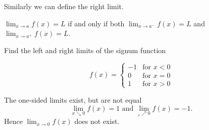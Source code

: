 \documentclass[../main.tex]{subfiles}
\begin{document}
  Similarly we can define the right limit.

  \begin{theorem}
    $\lim_{x \to a} f(x) = L$ if and only if both $\lim_{x \to a^{-}} f(x) =L$ and $\lim_{x \to a^{+}} f(x) = L$.
  \end{theorem}

  \begin{example}
    Find the left and right limits of the signum function

    \begin{minipage}[c]{0.5\textwidth}
      \[
        f(x) =
        \begin{cases}
          -1 & \text{for $x<0$}\\ 0 & \text{for $x=0$}\\ 1 & \text{for $x>0$}
        \end{cases}
      \]
    \end{minipage}
    \begin{minipage}[c]{0.2\textwidth}
      \begin{figure}[H]
        \centering
        
      \end{figure}
    \end{minipage}
  \end{example}
  \begin{solution}
    The one-sided limits exist, but are not equal
    \[
      \lim_{x\searrow0}f(x) = 1 \text{ and } \lim_{_x\nearrow0}f(x) = -1.
    \]
    Hence $\lim_{x\to 0} f(x)$ does not exist.
  \end{solution}


%   

\end{document}
